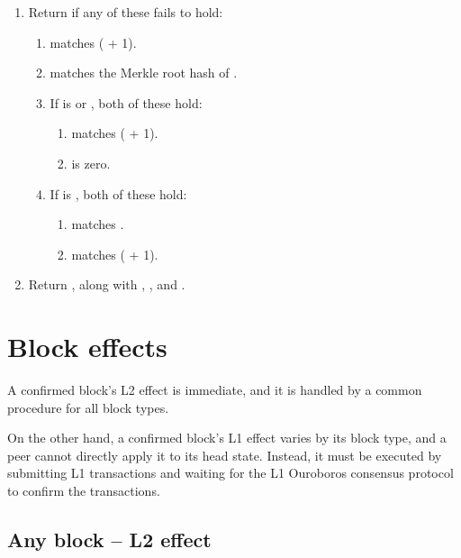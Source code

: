 \documentclass[../hydrozoa.tex]{subfiles}
\begin{document}
\begin{enumerate}
\begin{enumerate}
    \end{enumerate}
  \item Return  if any of these fails to hold:
    \begin{enumerate}
      \item {} matches ( + 1).
      \item {} matches the Merkle root hash of .
      \item If  is  or , both of these hold:
        \begin{enumerate}
          \item {} matches ( + 1).
          \item {} is zero.
        \end{enumerate}
      \item If  is , both of these hold:
        \begin{enumerate}
          \item {} matches .
          \item {} matches ( + 1).
        \end{enumerate}
    \end{enumerate}
  \item Return , along with , , and .
\end{enumerate}

\section{Block effects}%
\label{h:l2-block-effects}%

A confirmed block's L2 effect is immediate, and it is handled by a common procedure for all block types.

On the other hand, a confirmed block's L1 effect varies by its block type, and a peer cannot directly apply it to its head state.
Instead, it must be executed by submitting L1 transactions and waiting for the L1 Ouroboros consensus protocol to confirm the transactions.

\subsection{Any block -- L2 effect}%
\label{h:l2-block-effect-l2}%
\end{document}
